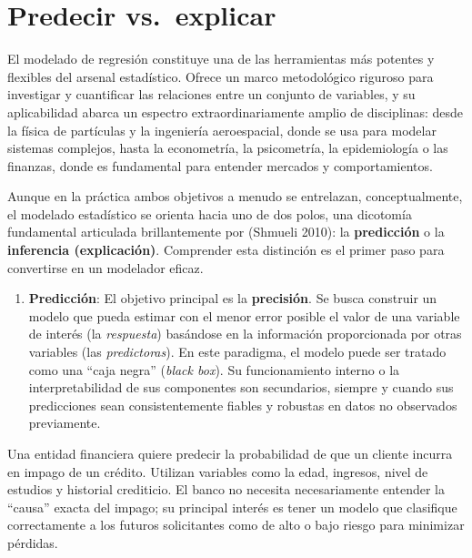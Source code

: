 \documentclass[
  letterpaper,
  DIV=11,
  numbers=noendperiod]{scrreprt}
\providecommand{\tightlist}{%
  \setlength{\itemsep}{0pt}\setlength{\parskip}{0pt}}
\begin{document}
\section{Predecir vs.~explicar}\label{sec-proposito}

El modelado de regresión constituye una de las herramientas más potentes
y flexibles del arsenal estadístico. Ofrece un marco metodológico
riguroso para investigar y cuantificar las relaciones entre un conjunto
de variables, y su aplicabilidad abarca un espectro extraordinariamente
amplio de disciplinas: desde la física de partículas y la ingeniería
aeroespacial, donde se usa para modelar sistemas complejos, hasta la
econometría, la psicometría, la epidemiología o las finanzas, donde es
fundamental para entender mercados y comportamientos.

Aunque en la práctica ambos objetivos a menudo se entrelazan,
conceptualmente, el modelado estadístico se orienta hacia uno de dos
polos, una dicotomía fundamental articulada brillantemente por (Shmueli
2010): la \textbf{predicción} o la \textbf{inferencia (explicación)}.
Comprender esta distinción es el primer paso para convertirse en un
modelador eficaz.

\begin{enumerate}
\def\labelenumi{\arabic{enumi}.}
\tightlist
\item
  \textbf{Predicción}: El objetivo principal es la \textbf{precisión}.
  Se busca construir un modelo que pueda estimar con el menor error
  posible el valor de una variable de interés (la \emph{respuesta})
  basándose en la información proporcionada por otras variables (las
  \emph{predictoras}). En este paradigma, el modelo puede ser tratado
  como una ``caja negra'' (\emph{black box}). Su funcionamiento interno
  o la interpretabilidad de sus componentes son secundarios, siempre y
  cuando sus predicciones sean consistentemente fiables y robustas en
  datos no observados previamente.
\end{enumerate}

\begin{tcolorbox}[enhanced jigsaw, leftrule=.75mm, breakable, colbacktitle=quarto-callout-tip-color!10!white, bottomrule=.15mm, colframe=quarto-callout-tip-color-frame, toprule=.15mm, colback=white, coltitle=black, bottomtitle=1mm, left=2mm, title=\textcolor{quarto-callout-tip-color}{\faLightbulb}\hspace{0.5em}{Ejemplo}, opacityback=0, arc=.35mm, opacitybacktitle=0.6, toptitle=1mm, titlerule=0mm, rightrule=.15mm]

Una entidad financiera quiere predecir la probabilidad de que un cliente
incurra en impago de un crédito. Utilizan variables como la edad,
ingresos, nivel de estudios y historial crediticio. El banco no necesita
necesariamente entender la ``causa'' exacta del impago; su principal
interés es tener un modelo que clasifique correctamente a los futuros
solicitantes como de alto o bajo riesgo para minimizar pérdidas.

\end{tcolorbox}
\end{document}

